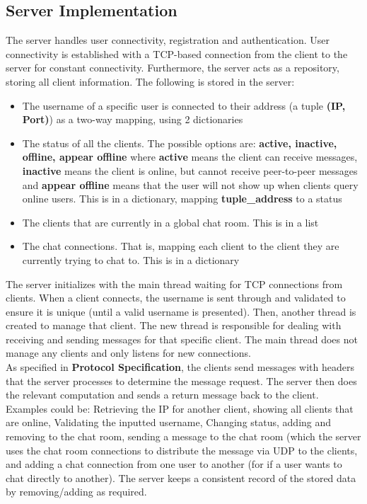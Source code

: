 \documentclass{article}
\begin{document}
\subsection{Server Implementation}
The server handles user connectivity, registration and authentication. User connectivity is established with a TCP-based connection from the client to the server for constant connectivity. Furthermore, the server acts as a repository, storing all client information. The following is stored in the server:
\begin{itemize}
    \item The username of a specific user is connected to their address (a tuple \textbf{(IP, Port)}) as a two-way mapping, using 2 dictionaries
    \item The status of all the clients. The possible options are: \textbf{active, inactive, offline, appear offline} where \textbf{active} means the client can receive messages, \textbf{inactive} means the client is online, but cannot receive peer-to-peer messages and \textbf{appear offline} means that the user will not show up when clients query online users. This is in a dictionary, mapping \textbf{tuple\_address} to a status
    \item{The clients that are currently in a global chat room. This is in a list}
    \item{The chat connections. That is, mapping each client to the client they are currently trying to chat to. This is in a dictionary}
\end{itemize}
The server initializes with the main thread waiting for TCP connections from clients. When a client connects, the username is sent through and validated to ensure it is unique (until a valid username is presented). Then, another thread is created to manage that client. The new thread is responsible for dealing with receiving and sending messages for that specific client. The main thread does not manage any clients and only listens for new connections. \\ As specified in \textbf{Protocol Specification}, the clients send messages with headers that the server processes to determine the message request. The server then does the relevant computation and sends a return message back to the client. Examples could be: Retrieving the IP for another client, showing all clients that are online, Validating the inputted username, Changing status, adding and removing to the chat room, sending a message to the chat room (which the server uses the chat room connections to distribute the message via UDP to the clients, and adding a chat connection from one user to another (for if a user wants to chat directly to another). The server keeps a consistent record of the stored data by removing/adding as required.
\end{document}
